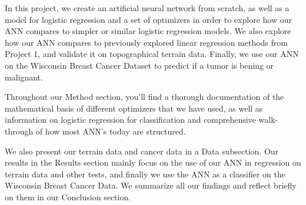 In this project, we create an artificial neural network from scratch, as well as a model for logistic regression and a set of optimizers 
in order to explore how our ANN compares to simpler or similar logistic regression models. We also explore how our ANN compares to previously 
explored linear regression methods from Project 1, and validate it on topographical terrain data. Finally, we use our ANN on the Wisconsin Breast Cancer Dataset to predict if a
tumor is bening or malignant. 

Throughout our Method section, you'll find a thorough documentation of the mathematical basis of different optimizers
that we have used, as well as information on logistic regression for classification and comprehensive walk-through of how most ANN's today are structured.

We also present our terrain data and cancer data in a Data subsection. Our results in the Results section mainly focus on the use of our ANN 
in regression on terrain data and other tests, and finally we use the ANN as a classifier on the Wisconsin Breast Cancer Data. We summarize all our 
findings and reflect briefly on them in our Conclusion section. 




